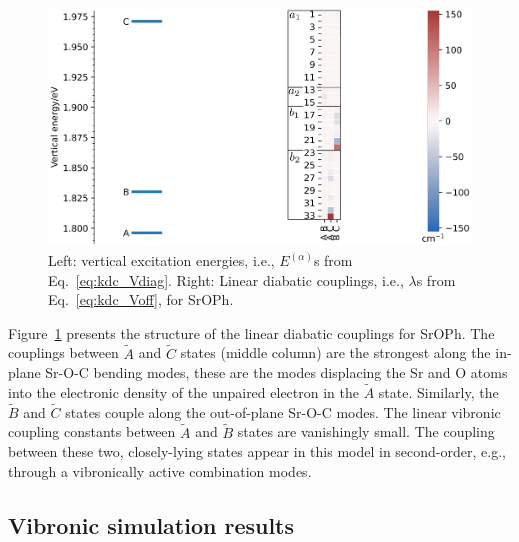 \documentclass{article}
\begin{document}
\begin{figure}
    \begin{center}
        \includegraphics[width=12 cm]{./figures/SrCoupplings.pdf}
    \end{center}
    \caption{
        Left: vertical excitation energies, i.e., $E ^{(\alpha)}$s from
        Eq.~\eqref{eq:kdc_Vdiag}. Right: Linear diabatic couplings, i.e.,
        $\lambda$s from Eq.~\eqref{eq:kdc_Voff}, for SrOPh. 
    }
    \label{fig:SrCouplings}
\end{figure}

Figure~\ref{fig:SrCouplings} presents the structure of the linear diabatic
couplings for SrOPh. The couplings between $\tilde{A}$ and $\tilde{C}$ states
(middle column) are the strongest along the in-plane Sr-O-C bending modes,
these are the modes displacing the Sr and O atoms into the electronic density
of the unpaired electron in the $\tilde{A}$ state. Similarly, the $\tilde{B}$
and $\tilde{C}$ states couple along the out-of-plane Sr-O-C modes. The linear
vibronic coupling constants between $\tilde{A}$ and $\tilde{B}$ states are
vanishingly small. The coupling between these two, closely-lying states appear
in this model in second-order, e.g., through a vibronically active combination
modes.

\subsection{Vibronic simulation results}
\label{sec:results:simulations}
\end{document}
